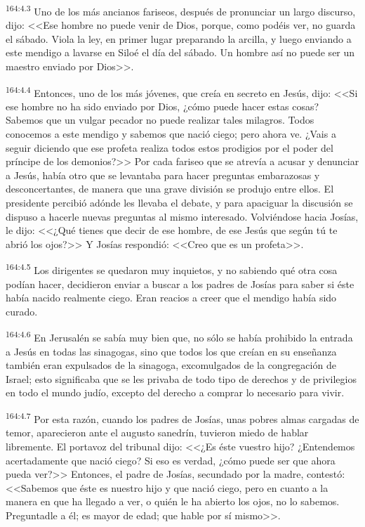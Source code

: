 \par 
\textsuperscript{164:4.3} Uno de los más ancianos fariseos, después de pronunciar un largo discurso, dijo: <<Ese hombre no puede venir de Dios, porque, como podéis ver, no guarda el sábado. Viola la ley, en primer lugar preparando la arcilla, y luego enviando a este mendigo a lavarse en Siloé el día del sábado. Un hombre así no puede ser un maestro enviado por Dios>>.

\par 
\textsuperscript{164:4.4} Entonces, uno de los más jóvenes, que creía en secreto en Jesús, dijo: <<Si ese hombre no ha sido enviado por Dios, ¿cómo puede hacer estas cosas? Sabemos que un vulgar pecador no puede realizar tales milagros. Todos conocemos a este mendigo y sabemos que nació ciego; pero ahora ve. ¿Vais a seguir diciendo que ese profeta realiza todos estos prodigios por el poder del príncipe de los demonios?>> Por cada fariseo que se atrevía a acusar y denunciar a Jesús, había otro que se levantaba para hacer preguntas embarazosas y desconcertantes, de manera que una grave división se produjo entre ellos. El presidente percibió adónde les llevaba el debate, y para apaciguar la discusión se dispuso a hacerle nuevas preguntas al mismo interesado. Volviéndose hacia Josías, le dijo: <<¿Qué tienes que decir de ese hombre, de ese Jesús que según tú te abrió los ojos?>> Y Josías respondió: <<Creo que es un profeta>>.

\par 
\textsuperscript{164:4.5} Los dirigentes se quedaron muy inquietos, y no sabiendo qué otra cosa podían hacer, decidieron enviar a buscar a los padres de Josías para saber si éste había nacido realmente ciego. Eran reacios a creer que el mendigo había sido curado.

\par 
\textsuperscript{164:4.6} En Jerusalén se sabía muy bien que, no sólo se había prohibido la entrada a Jesús en todas las sinagogas, sino que todos los que creían en su enseñanza también eran expulsados de la sinagoga, excomulgados de la congregación de Israel; esto significaba que se les privaba de todo tipo de derechos y de privilegios en todo el mundo judío, excepto del derecho a comprar lo necesario para vivir.

\par 
\textsuperscript{164:4.7} Por esta razón, cuando los padres de Josías, unas pobres almas cargadas de temor, aparecieron ante el augusto sanedrín, tuvieron miedo de hablar libremente. El portavoz del tribunal dijo: <<¿Es éste vuestro hijo? ¿Entendemos acertadamente que nació ciego? Si eso es verdad, ¿cómo puede ser que ahora pueda ver?>> Entonces, el padre de Josías, secundado por la madre, contestó: <<Sabemos que éste es nuestro hijo y que nació ciego, pero en cuanto a la manera en que ha llegado a ver, o quién le ha abierto los ojos, no lo sabemos. Preguntadle a él; es mayor de edad; que hable por sí mismo>>.

